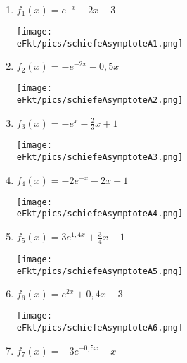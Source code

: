 \begin{Answer}[ref=schAsyA1]

	\begin{minipage}{\textwidth}
		\begin{minipage}{0.5\textwidth}
			\begin{enumerate}[label=\alph*)]
				\item \(f_1(x)=e^{-x}+2x-3\)

                \begin{minipage}[t]{0.87\textwidth}
					\texttt{[image: \\eFkt/pics/schiefeAsymptoteA1.png]}
				\end{minipage}
				\item \(f_2(x)=-e^{-2x}+0,5x\)

                \begin{minipage}[t]{0.87\textwidth}
					\texttt{[image: \\eFkt/pics/schiefeAsymptoteA2.png]}
				\end{minipage}
				\item \(f_3(x)=-e^{x}-\frac{2}{3}x+1\)

                \begin{minipage}[t]{0.87\textwidth}
					\texttt{[image: \\eFkt/pics/schiefeAsymptoteA3.png]}
				\end{minipage}
				\item \(f_4(x)=-2e^{-x}-2x+1\)

                \begin{minipage}[t]{0.87\textwidth}
					\texttt{[image: \\eFkt/pics/schiefeAsymptoteA4.png]}
				\end{minipage}
			\end{enumerate}
		\end{minipage}%
		\begin{minipage}{0.5\textwidth}
			\begin{enumerate}[label=\alph*)]
				\setcounter{enumi}{4}
				\item \(f_5(x)=3e^{1,4x}+\frac{3}{4}x-1\)

                \begin{minipage}[t]{0.87\textwidth}
					\texttt{[image: \\eFkt/pics/schiefeAsymptoteA5.png]}
				\end{minipage}
				\item \(f_6(x)=e^{2x}+0,4x-3\)

                \begin{minipage}[t]{0.87\textwidth}
					\texttt{[image: \\eFkt/pics/schiefeAsymptoteA6.png]}
				\end{minipage}
				\item \(f_7(x)=-3e^{-0,5x}-x\)


\end{enumerate}
\end{minipage}
\end{minipage}
\end{Answer}
